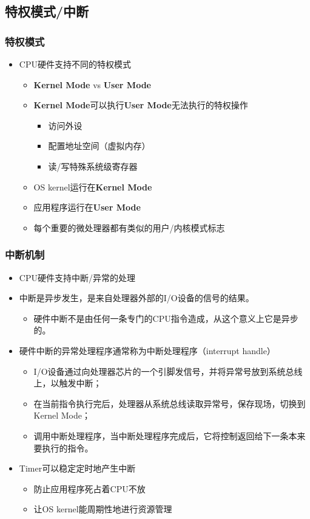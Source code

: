 \subsection{特权模式/中断}

\begin{frame}
	\frametitle{特权模式}
	\begin{itemize}
		\item CPU硬件支持不同的特权模式
		\begin{itemize}
			\item \textbf{Kernel Mode} vs \textbf{User Mode}
			\item \textbf{Kernel Mode}可以执行\textbf{User Mode}无法执行的特权操作
			\begin{itemize}
				\item 访问外设
				\item 配置地址空间（虚拟内存）
				\item 读/写特殊系统级寄存器
			\end{itemize}			
			
			\item OS kernel运行在\textbf{Kernel Mode} 
			\item 应用程序运行在\textbf{User Mode}
			\item 每个重要的微处理器都有类似的用户/内核模式标志
				
		\end{itemize}
	\end{itemize}
\end{frame}

\begin{frame}
	\frametitle{中断机制}
	\begin{itemize}
		\item CPU硬件支持中断/异常的处理
		\item 中断是异步发生，是来自处理器外部的I/O设备的信号的结果。
		\begin{itemize}
			\item 硬件中断不是由任何一条专门的CPU指令造成，从这个意义上它是异步的。
			
		\end{itemize}
\pause
			\item 硬件中断的异常处理程序通常称为中断处理程序（interrupt handle）
			\begin{itemize}
				\item I/O设备通过向处理器芯片的一个引脚发信号，并将异常号放到系统总线上，以触发中断；
				\item 在当前指令执行完后，处理器从系统总线读取异常号，保存现场，切换到Kernel Mode；
				\item 调用中断处理程序，当中断处理程序完成后，它将控制返回给下一条本来要执行的指令。
			\end{itemize}			
\pause
			\item Timer可以稳定定时地产生中断
			\begin{itemize}
				\item 防止应用程序死占着CPU不放
				\item 让OS kernel能周期性地进行资源管理
			\end{itemize}				
	\end{itemize}
\end{frame}



